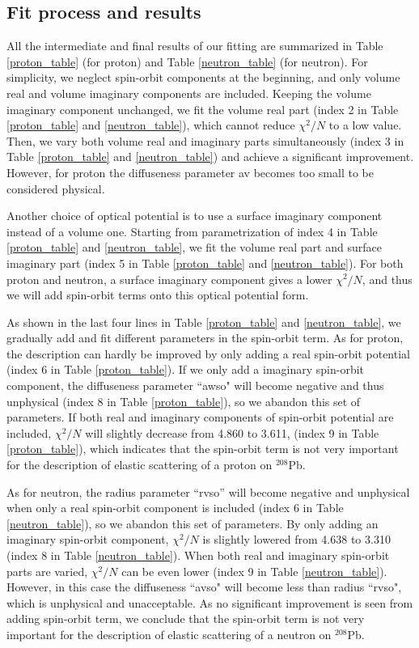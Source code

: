 \subsection{Fit process and results}
All the intermediate and final results of our fitting are summarized in Table \ref{proton_table} (for proton) and Table \ref{neutron_table} (for neutron). 
For simplicity, we neglect spin-orbit components at the beginning, and only volume real and volume imaginary components are included. 
Keeping the volume imaginary component unchanged, we fit the volume real part (index 2 in Table \ref{proton_table} and \ref{neutron_table}), 
which cannot reduce $\chi^2/N$ to a low value. 
Then, we vary both volume real and imaginary parts simultaneously (index 3 in Table \ref{proton_table} and \ref{neutron_table}) and 
achieve a significant improvement.  
However, for proton the diffuseness parameter av becomes too small to be considered physical. 
\par
Another choice of optical potential is to use a surface imaginary component instead of a volume one. 
Starting from parametrization of index 4 in Table \ref{proton_table} and \ref{neutron_table}, we fit the volume real part and surface imaginary part 
(index 5 in Table \ref{proton_table} and \ref{neutron_table}). 
For both proton and neutron, a surface imaginary component gives a lower $\chi^2/N$, 
and thus we will add spin-orbit terms onto this optical potential form. 
\par
As shown in the last four lines in Table \ref{proton_table} and \ref{neutron_table}, 
we gradually add and fit different parameters in the spin-orbit term.  
As for proton, the description can hardly be improved by only adding a real spin-orbit potential (index 6 in Table \ref{proton_table}).  
If we only add a imaginary spin-orbit component, the diffuseness parameter ``awso" will become negative and thus unphysical 
(index 8 in Table \ref{proton_table}), so we abandon this set of parameters. 
If both real and imaginary components of spin-orbit potential are included, $\chi^2/N$ will slightly decrease from 4.860 to 3.611,
(index 9 in Table \ref{proton_table}), which indicates that the spin-orbit term is not very important 
for the description of elastic scattering of a proton on $^{208}$Pb. 
\par
As for neutron, the radius parameter ``rvso'' will become negative and unphysical when only a real spin-orbit component is included 
(index 6 in Table \ref{neutron_table}), so we abandon this set of parameters. 
By only adding an imaginary spin-orbit component, $\chi^2/N$ is slightly lowered from 4.638 to 3.310 
(index 8 in Table \ref{neutron_table}). 
When both real and imaginary spin-orbit parts are varied, $\chi^2/N$ can be even lower (index 9 in Table \ref{neutron_table}). 
However, in this case the diffuseness ``avso" will become less than radius ``rvso", which is unphysical and unacceptable. 
As no significant improvement is seen from adding spin-orbit term, we conclude that 
the spin-orbit term is not very important for the description of elastic scattering of a neutron on $^{208}$Pb. 


